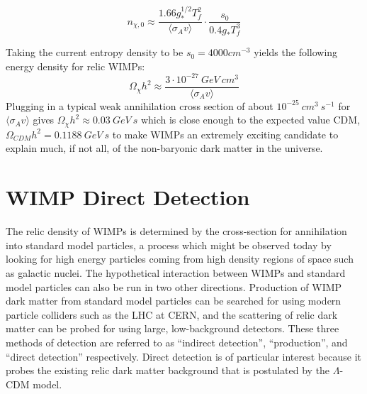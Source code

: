 \begin{equation}
n_{\chi,0} 
\approx
\frac{1.66 g_{*}^{1/2}T_{f}^{2}}{\langle \sigma_{A}v \rangle }
\cdot
\frac{s_{0}}{0.4 g_{*}T_{f}^{3}}
\end{equation} 

Taking the current entropy density to be $s_{0}=4000 cm^{-3}$\cite{susyDM} yields the following energy density for relic WIMPs:
\begin{equation}
\Omega_{\chi} h^{2}
\approx
\frac{3 \cdot 10^{-27} \ GeV \ cm^{3}}{\langle \sigma_{A}v \rangle}
\end{equation}
Plugging in a typical weak annihilation cross section of about $10^{-25} \ cm^{3} \ s^{-1}$ for $\langle \sigma_{A}v \rangle$ gives $\Omega_{\chi} h^{2} \approx 0.03 \ GeV \ s$ which is close enough to the expected value CDM, $\Omega_{CDM} h^{2} = 0.1188 \ GeV \ s$\cite{planck2015} to make WIMPs an extremely exciting candidate to explain much, if not all, of the non-baryonic dark matter in the universe\cite{susyDM,wimp2}.


\section{WIMP Direct Detection}
The relic density of WIMPs is determined by the cross-section for annihilation into standard model particles, a process which might be observed today by looking for high energy particles coming from high density regions of space such as galactic nuclei. The hypothetical interaction between WIMPs and standard model particles can also be run in two other directions. Production of WIMP dark matter from standard model particles can be searched for using modern particle colliders such as the LHC at CERN, and the scattering of relic dark matter can be probed for using large, low-background detectors. These three methods of detection are referred to as ``indirect detection'', ``production'', and ``direct detection'' respectively. Direct detection is of particular interest because it probes the existing relic dark matter background that is postulated by the $\Lambda$-CDM model.

